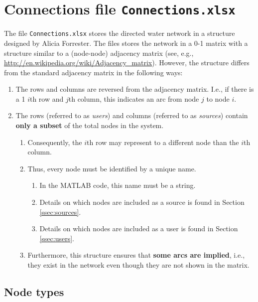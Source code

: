 \documentclass[11pt]{article}
\newcommand{\connections}{\texttt{Connections.xlsx}}
\begin{document}
\section{Connections file \connections}
\label{sec:connectionsxlsx}

The file \texttt{Connections.xlsx} stores the directed water network in a structure designed by Alicia Forrester.
The files stores the network in a 0-1 matrix with a structure similar to a (node-node) adjacency matrix (see, e.g., \url{http://en.wikipedia.org/wiki/Adjacency_matrix}).
However, the structure differs from the standard adjacency matrix in the following ways:
\begin{enumerate}
	\item The rows and columns are reversed from the adjacency matrix.
		I.e., if there is a 1 $i$th row and $j$th column, this indicates an arc from node $j$ to node $i$.
	\item The rows (referred to as \emph{users}) and columns (referred to as \emph{sources}) contain \textbf{only a subset} of the total nodes in the system.
	\begin{enumerate}
		\item Consequently, the $i$th row may represent to a different node than the $i$th column.
		\item Thus, every node must be identified by a unique name.
		\begin{enumerate}
			\item In the MATLAB code, this name must be a string.
			\item Details on which nodes are included as a source is found in Section \ref{ssec:sources}.
			\item Details on which nodes are included as a user is found in Section \ref{ssec:users}.
		\end{enumerate}
		\item Furthermore, this structure ensures that \textbf{some arcs are implied}, i.e., they exist in the network even though they are not shown in the matrix.
	\end{enumerate}
\end{enumerate}

\subsection{Node types}
\label{ssec:nodetypes}
\end{document}
